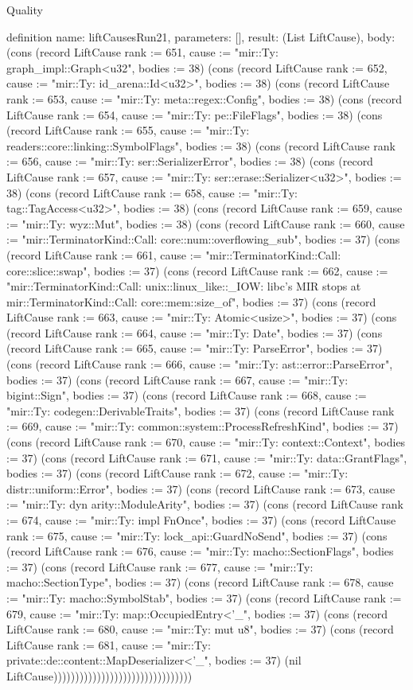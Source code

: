 \begin{lexlean}{Quality}
\begin{semanticmodule}
definition{
  name: liftCausesRun21,
  parameters: [],
  result: (List LiftCause),
  body: (cons (record LiftCause {rank := 651, cause := "mir::Ty: graph_impl::Graph<u32", bodies := 38}) (cons (record LiftCause {rank := 652, cause := "mir::Ty: id_arena::Id<u32>", bodies := 38}) (cons (record LiftCause {rank := 653, cause := "mir::Ty: meta::regex::Config", bodies := 38}) (cons (record LiftCause {rank := 654, cause := "mir::Ty: pe::FileFlags", bodies := 38}) (cons (record LiftCause {rank := 655, cause := "mir::Ty: readers::core::linking::SymbolFlags", bodies := 38}) (cons (record LiftCause {rank := 656, cause := "mir::Ty: ser::SerializerError", bodies := 38}) (cons (record LiftCause {rank := 657, cause := "mir::Ty: ser::erase::Serializer<u32>", bodies := 38}) (cons (record LiftCause {rank := 658, cause := "mir::Ty: tag::TagAccess<u32>", bodies := 38}) (cons (record LiftCause {rank := 659, cause := "mir::Ty: wyz::Mut", bodies := 38}) (cons (record LiftCause {rank := 660, cause := "mir::TerminatorKind::Call: core::num::overflowing_sub", bodies := 37}) (cons (record LiftCause {rank := 661, cause := "mir::TerminatorKind::Call: core::slice::swap", bodies := 37}) (cons (record LiftCause {rank := 662, cause := "mir::TerminatorKind::Call: unix::linux_like::_IOW: libc's MIR stops at mir::TerminatorKind::Call: core::mem::size_of", bodies := 37}) (cons (record LiftCause {rank := 663, cause := "mir::Ty: Atomic<usize>", bodies := 37}) (cons (record LiftCause {rank := 664, cause := "mir::Ty: Date", bodies := 37}) (cons (record LiftCause {rank := 665, cause := "mir::Ty: ParseError", bodies := 37}) (cons (record LiftCause {rank := 666, cause := "mir::Ty: ast::error::ParseError", bodies := 37}) (cons (record LiftCause {rank := 667, cause := "mir::Ty: bigint::Sign", bodies := 37}) (cons (record LiftCause {rank := 668, cause := "mir::Ty: codegen::DerivableTraits", bodies := 37}) (cons (record LiftCause {rank := 669, cause := "mir::Ty: common::system::ProcessRefreshKind", bodies := 37}) (cons (record LiftCause {rank := 670, cause := "mir::Ty: context::Context", bodies := 37}) (cons (record LiftCause {rank := 671, cause := "mir::Ty: data::GrantFlags", bodies := 37}) (cons (record LiftCause {rank := 672, cause := "mir::Ty: distr::uniform::Error", bodies := 37}) (cons (record LiftCause {rank := 673, cause := "mir::Ty: dyn arity::ModuleArity", bodies := 37}) (cons (record LiftCause {rank := 674, cause := "mir::Ty: impl FnOnce", bodies := 37}) (cons (record LiftCause {rank := 675, cause := "mir::Ty: lock_api::GuardNoSend", bodies := 37}) (cons (record LiftCause {rank := 676, cause := "mir::Ty: macho::SectionFlags", bodies := 37}) (cons (record LiftCause {rank := 677, cause := "mir::Ty: macho::SectionType", bodies := 37}) (cons (record LiftCause {rank := 678, cause := "mir::Ty: macho::SymbolStab", bodies := 37}) (cons (record LiftCause {rank := 679, cause := "mir::Ty: map::OccupiedEntry<'_", bodies := 37}) (cons (record LiftCause {rank := 680, cause := "mir::Ty: mut u8", bodies := 37}) (cons (record LiftCause {rank := 681, cause := "mir::Ty: private::de::content::MapDeserializer<'_", bodies := 37}) (nil LiftCause))))))))))))))))))))))))))))))))
}


\end{semanticmodule}
\end{lexlean}
